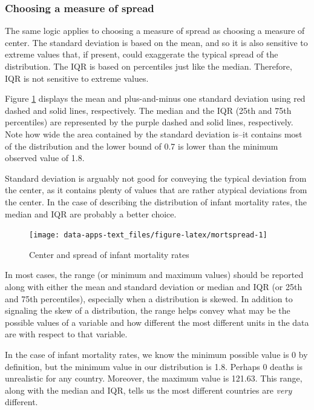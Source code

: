 \documentclass[
]{book}
\begin{document}
\hypertarget{choosing-a-measure-of-spread}{%
\subsubsection*{Choosing a measure of spread}\label{choosing-a-measure-of-spread}}

The same logic applies to choosing a measure of spread as choosing a measure of center. The standard deviation is based on the mean, and so it is also sensitive to extreme values that, if present, could exaggerate the typical spread of the distribution. The IQR is based on percentiles just like the median. Therefore, IQR is not sensitive to extreme values.

Figure \ref{fig:mortspread} displays the mean and plus-and-minus one standard deviation using red dashed and solid lines, respectively. The median and the IQR (25th and 75th percentiles) are represented by the purple dashed and solid lines, respectively. Note how wide the area contained by the standard deviation is--it contains most of the distribution and the lower bound of 0.7 is lower than the minimum observed value of 1.8.

Standard deviation is arguably not good for conveying the typical deviation from the center, as it contains plenty of values that are rather atypical deviations from the center. In the case of describing the distribution of infant mortality rates, the median and IQR are probably a better choice.

\begin{figure}

{\centering \texttt{[image: data-apps-text\_files/figure-latex/mortspread-1]} 

}

\caption{Center and spread of infant mortality rates}\label{fig:mortspread}
\end{figure}

In most cases, the range (or minimum and maximum values) should be reported along with either the mean and standard deviation or median and IQR (or 25th and 75th percentiles), especially when a distribution is skewed. In addition to signaling the skew of a distribution, the range helps convey what may be the possible values of a variable and how different the most different units in the data are with respect to that variable.

In the case of infant mortality rates, we know the minimum possible value is 0 by definition, but the minimum value in our distribution is 1.8. Perhaps 0 deaths is unrealistic for any country. Moreover, the maximum value is 121.63. This range, along with the median and IQR, tells us the most different countries are \emph{very} different.
\end{document}
